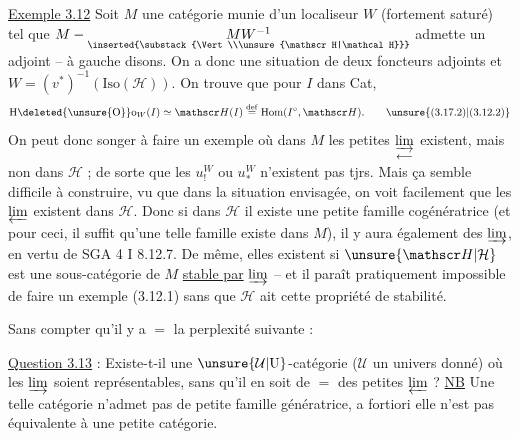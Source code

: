 \uline{Exemple 3.12} Soit $M$ une catégorie munie
d'un localiseur $W$ (fortement saturé) tel
que $M-\underset{\inserted{\substack{\Vert\\\unsure{\mathscr H|\mathcal H}}}}{MW^{-1}}$ admette un adjoint
-- à gauche disons. On a donc une situation
de deux foncteurs adjoints
et $W=(v^*)^{-1}(\mathrm{Iso}(\mathscr H))$. On trouve
que pour  $I$ dans Cat, 
\[
 \mathrm H\deleted{\unsure{\mathrm O}}\mathrm o_W(I)\simeq\mathscr H(I)\overset{\mathrm{def}}{=}\mathrm{Hom}(I^\circ,\mathscr H).\tag*{\unsure{(3.17.2)|(3.12.2)}}
\]
On peut donc songer à faire un
exemple où dans $M$ les petites $\underset{\longleftarrow}{\varinjlim}$
existent, mais non dans $\mathscr H$ ; de sorte
que les $u^W_!$ ou $u^W_*$ n'existent pas
tjrs. Mais ça semble difficile à
construire, vu que dans la situation
envisagée, on voit facilement que les 
$\varprojlim$ existent dans $\mathscr H$. Donc si dans $\mathscr H$
il existe une petite famille cogénératrice\unsure{,|;}
(et pour ceci, il suffit qu'une telle
famille existe dans $M$), il y aura également
des  $\varinjlim$, en vertu de SGA 4 I 8.12.7.
De même, elles existent si $\unsure{\mathscr H|\mathcal H}$ est une
sous-catégorie  de $M$ \uline{stable par}  $\varinjlim$ --
et il paraît pratiquement impossible
de faire un exemple (3.12.1) sans que
$\mathscr H$ ait cette propriété de stabilité.

Sans compter qu'il y a $=$ la perplexité
suivante :

\uline{Question 3.13} : Existe-t-il une
{\reversemarginpar\margin{!\hfill\rule[-2em]{.4pt}{4em}}}%
$\unsure{\mathcal U|\mathrm U}$-catégorie ($\mathcal U$ un univers donné)
où les  $\varinjlim$  soient
représentables, sans qu'il en soit de
$=$ des petites $\varprojlim$ ? \uline{NB} Une
telle catégorie n'admet pas de petite
famille génératrice, a fortiori elle
n'est pas équivalente à une petite
catégorie.

